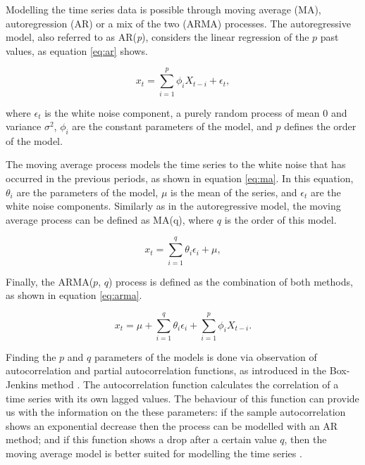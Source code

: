 \par Modelling the time series data is possible through moving average (MA), autoregression (AR) or a mix of the two (ARMA) processes. 
The autoregressive model, also referred to as AR(\textit{p}), considers the linear regression of the $p$ past values, as equation \ref{eq:ar} shows.

\begin{equation}
    x_t = \sum^p_{i=1}\phi_i X_{t-i} + \epsilon_t,
    \label{eq:ar}
\end{equation}

\par where $\epsilon_t$ is the white noise component, a purely random process of mean 0 and variance $\sigma^2$, $\phi_i$ are the constant parameters of the model,
and $p$ defines the order of the model.

\par The moving average process models the time series to the white noise that has occurred in the previous periods, as shown in equation \ref{eq:ma}. In this
equation, $\theta_i$ are the parameters of the model, $\mu$ is the mean of the series, and $\epsilon_t$ are the white noise components. Similarly as in the 
autoregressive model, the moving average process can be defined as MA(q), where $q$ is the order of this model.

\begin{equation}
    x_t = \sum^q_{i=1}\theta_i\epsilon_i + \mu,
    \label{eq:ma}
\end{equation}

\par Finally, the ARMA($p$, $q$) process is defined as the combination of both methods, as shown in equation \ref{eq:arma}.

\begin{equation}
    x_t = \mu + \sum^q_{i=1}\theta_i\epsilon_i + \sum^p_{i=1}\phi_i X_{t-i}.
    \label{eq:arma}
\end{equation}

\par Finding the $p$ and $q$ parameters of the models is done via observation of autocorrelation and partial autocorrelation functions, as introduced in the
Box-Jenkins method \cite{box_time_2016}. The autocorrelation function calculates the correlation of a time series with its own lagged values. The behaviour 
of this function can provide us with the information on the these parameters: if the sample autocorrelation shows an exponential decrease then the process can be 
modelled with an AR method; and if this function shows a drop after a certain value $q$, then the moving average model is better suited for modelling the time series
\cite{munz_traffic_2010}.


